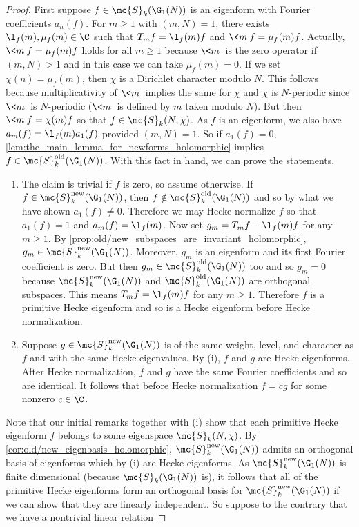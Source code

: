     \begin{proof}
      First suppose $f \in \mc{S}_{k}(\G_{1}(N))$ is an eigenform with Fourier coefficients $a_{n}(f)$. For $m \ge 1$ with $(m,N) = 1$, there exists $\l_{f}(m),\mu_{f}(m) \in \C$ such that $T_{m}f = \l_{f}(m)f$ and $\<m\>f = \mu_{f}(m)f$. Actually, $\<m\>f = \mu_{f}(m)f$ holds for all $m \ge 1$ because $\<m\>$ is the zero operator if $(m,N) > 1$ and in this case we can take $\mu_{f}(m) = 0$. If we set $\chi(n) = \mu_{f}(m)$, then $\chi$ is a Dirichlet character modulo $N$. This follows because multiplicativity of $\<m\>$ implies the same for $\chi$ and $\chi$ is $N$-periodic since $\<m\>$ is $N$-periodic ($\<m\>$ is defined by $m$ taken modulo $N$). But then $\<m\>f = \chi(m)f$ so that $f \in \mc{S}_{k}(N,\chi)$. As $f$ is an eigenform, we also have $a_{m}(f) = \l_{f}(m)a_{1}(f)$ provided $(m,N) = 1$. So if $a_{1}(f) = 0$, \cref{lem:the_main_lemma_for_newforms_holomorphic} implies $f \in \mc{S}_{k}^{\mathrm{old}}(\G_{1}(N))$. With this fact in hand, we can prove the statements.
      \begin{enumerate}[label=(\roman*)]
        \item The claim is trivial if $f$ is zero, so assume otherwise. If $f \in \mc{S}_{k}^{\mathrm{new}}(\G_{1}(N))$, then $f \notin \mc{S}_{k}^{\mathrm{old}}(\G_{1}(N))$ and so by what we have shown $a_{1}(f) \neq 0$. Therefore we may Hecke normalize $f$ so that $a_{1}(f) = 1$ and $a_{m}(f) = \l_{f}(m)$. Now set $g_{m} = T_{m}f-\l_{f}(m)f$ for any $m \ge 1$. By \cref{prop:old/new_subspaces_are_invariant_holomorphic}, $g_{m} \in \mc{S}_{k}^{\mathrm{new}}(\G_{1}(N))$. Moreover, $g_{m}$ is an eigenform and its first Fourier coefficient is zero. But then $g_{m} \in \mc{S}_{k}^{\mathrm{old}}(\G_{1}(N))$ too and so $g_{m} = 0$ because $\mc{S}_{k}^{\mathrm{new}}(\G_{1}(N))$ and $\mc{S}_{k}^{\mathrm{old}}(\G_{1}(N))$ are orthogonal subspaces. This means $T_{m}f = \l_{f}(m)f$ for any $m \ge 1$. Therefore $f$ is a primitive Hecke eigenform and so is a Hecke eigenform before Hecke normalization.
        \item Suppose $g \in \mc{S}_{k}^{\mathrm{new}}(\G_{1}(N))$ is of the same weight, level, and character as $f$ and with the same Hecke eigenvalues. By (i), $f$ and $g$ are Hecke eigenforms. After Hecke normalization, $f$ and $g$ have the same Fourier coefficients and so are identical. It follows that before Hecke normalization $f = cg$ for some nonzero $c \in \C$.
      \end{enumerate}
      Note that our initial remarks together with (i) show that each primitive Hecke eigenform $f$ belongs to some eigenspace $\mc{S}_{k}(N,\chi)$. By \cref{cor:old/new_eigenbasis_holomorphic}, $\mc{S}_{k}^{\mathrm{new}}(\G_{1}(N))$ admits an orthogonal basis of eigenforms which by (i) are Hecke eigenforms. As $\mc{S}_{k}^{\mathrm{new}}(\G_{1}(N))$ is finite dimensional (because $\mc{S}_{k}(\G_{1}(N))$ is), it follows that all of the primitive Hecke eigenforms form an orthogonal basis for $\mc{S}_{k}^{\mathrm{new}}(\G_{1}(N))$ if we can show that they are linearly independent. So suppose to the contrary that we have a nontrivial linear relation

\end{proof}
